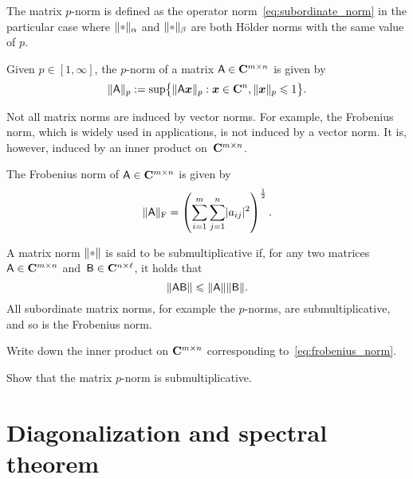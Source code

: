 The matrix $p$-norm is defined as the operator norm~\eqref{eq:subordinate_norm} in the particular case
where $\norm{\placeholder}_{\alpha}$ and $\norm{\placeholder}_{\beta}$ are both H\"older norms with the same value of $p$.
\begin{definition}
Given $p \in [1, \infty]$,
the $p$-norm of a matrix $\mathsf A \in \mathbf C^{m\times n}$ is given by
\begin{equation}
    \label{eq:matrix_p_norm}
    \lVert\mathsf A\rVert_{p} := \sup \bigl\{ \lVert\mathsf A \mathbf{\boldsymbol{x}}\rVert_{p} : \mathbf{\boldsymbol{x}} \in \mathbf C^n, \lVert\mathbf{\boldsymbol{x}}\rVert_{p} \leqslant 1 \bigr\}.
\end{equation}
\end{definition}
Not all matrix norms are induced by vector norms.
For example, the Frobenius norm,
which is widely used in applications,
is not induced by a vector norm.
It is, however, induced by an inner product on~$\mathbf C^{m \times n}$.
\begin{definition}
    The Frobenius norm of $\mathsf A \in \mathbf C^{m\times n}$ is given by
    \begin{equation}
        \label{eq:frobenius_norm}
        \lVert\mathsf A\rVert_{\rm F} = \left( \sum_{i=1}^{m} \sum_{j=1}^{n} \lvert a_{ij}\rvert^2 \right)^{\frac{1}{2}}.
    \end{equation}
\end{definition}

A matrix norm $\norm{\placeholder}$ is said to be submultiplicative if,
for any two matrices $\mathsf A \in \mathbf C^{m \times n}$ and~$\mathsf B \in \mathbf C^{n \times \ell}$,
it holds that
\[
    \lVert\mathsf A \mathsf B\rVert \leqslant \lVert\mathsf A\rVert \lVert\mathsf B\rVert.
\]
All subordinate matrix norms,
for example the $p$-norms, are submultiplicative,
and so is the Frobenius norm.

\begin{exercise}
    Write down the inner product on $\mathbf C^{m \times n}$ corresponding to~\eqref{eq:frobenius_norm}.
\end{exercise}
\begin{exercise}
    Show that the matrix $p$-norm is submultiplicative.
\end{exercise}

\newpage
\section{Diagonalization and spectral theorem}%
\label{sec:diagonalization}


